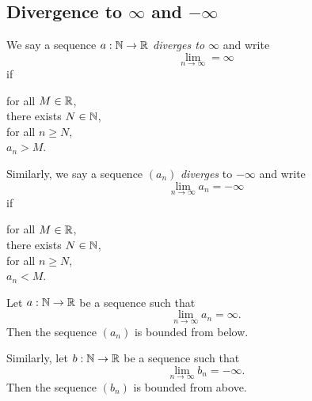 \subsection{Divergence to \texorpdfstring{$\infty$}{infinity} and \texorpdfstring{$-\infty$}{minus infinity}}
\begin{definition}
    We say a sequence $a: \mathbb{N} \to \mathbb{R}$ \emph{diverges to $\infty$} and write 
    $$\lim_{n\to\infty} = \infty$$
    if
    \begin{center}
        \parbox{\linewidth}{
        \linewidth
        for all $M \in \mathbb{R}$, \\
        \tab there exists $N \in \mathbb{N}$, \\
        \tab\tab for all $n \ge N$, \\
        \tab\tab\tab $a_n > M$.
        }
    \end{center}

    Similarly, we say a sequence $(a_n)$ \emph{diverges} to $-\infty$ and write
    $$\lim_{n\to\infty}a_n = -\infty$$
    if
    \begin{center}
        \parbox{\linewidth}{
        \linewidth
        for all $M \in \mathbb{R}$, \\
        \tab there exists $N \in \mathbb{N}$, \\
        \tab\tab for all $n \ge N$, \\
        \tab\tab\tab $a_n < M$.
        }
    \end{center}
\end{definition}

\begin{proposition}
    Let $a: \mathbb{N} \to \mathbb{R}$ be a sequence such that 
    $$\lim_{n\to\infty}a_n = \infty.$$
    Then the sequence $(a_n)$ is bounded from below.

    Similarly, let $b: \mathbb{N} \to \mathbb{R}$ be a sequence such that 
    $$\lim_{n\to\infty}b_n = -\infty.$$
    Then the sequence $(b_n)$ is bounded from above.
\end{proposition}

